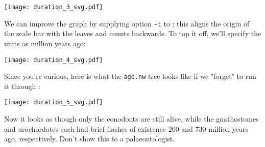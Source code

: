 
\begin{center}
 \texttt{[image: duration\_3\_svg.pdf]}
\end{center}

\noindent{}We can improve the graph by supplying option \texttt{-t} to
\display{}: this aligns the origin of the scale bar with the leaves and counts
backwards. To top it off, we'll specify the units as million years ago:


\begin{center}
 \texttt{[image: duration\_4\_svg.pdf]}
\end{center}


Since you're curious, here is what the \texttt{age.nw} tree looks like if we
"forget" to run it through \duration:


\begin{center}
 \texttt{[image: duration\_5\_svg.pdf]}
\end{center}

\noindent{}Now it looks as though only the conodonts are still alive, while the
gnathostomes and urochordates each had brief flashes of existence 200 and 730
million years ago, respectively. Don't show this to a palaeontologist.


